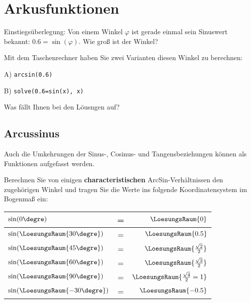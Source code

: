 
\section{Arkusfunktionen}

Einstiegsüberlegung: Von einem Winkel $\varphi$ ist gerade einmal sein Sinuswert bekannt: $0.6 = \sin(\varphi)$. Wie groß ist der Winkel?

\trigsysDsin{}



Mit dem Taschenrechner haben Sie zwei Varianten diesen Winkel zu berechnen:

A) \texttt{arcsin(0.6)}

B) \texttt{solve(0.6=sin(x), x)}

Was fällt Ihnen bei den Löusngen auf?
\newpage



\subsection{Arcussinus}
Auch die Umkehrungen der Sinus-, Cosinus- und Tangensbeziehungen können
als Funktionen aufgefasst werden.

Berechnen Sie von einigen \textbf{characteristischen}
ArcSin-Verhältnissen den zugehörigen Winkel und tragen Sie die Werte ins folgende
Koordinatensystem im Bogenmaß ein:

\begin{tabular}{l|c|r}
$\sin(0\degre)$ &=& $\LoesungsRaum{0}$\\\hline
$\sin(\LoesungsRaum{30\degre})$ &=& $\LoesungsRaum{0.5}$\\\hline
$\sin(\LoesungsRaum{45\degre})$ &=& $\LoesungsRaum{\frac{\sqrt{2}}{2}}$\\\hline
$\sin(\LoesungsRaum{60\degre})$ &=& $\LoesungsRaum{\frac{\sqrt{3}}{2}}$\\\hline
$\sin(\LoesungsRaum{90\degre})$ &=& $\LoesungsRaum{\frac{\sqrt{4}}{2} = 1}$\\\hline
$\sin(\LoesungsRaum{-30\degre})$ &=& $\LoesungsRaum{-0.5}$
\end{tabular}



